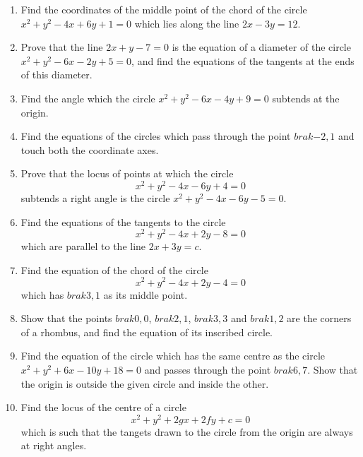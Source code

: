 \begin{enumerate}[1.]
\item Find the coordinates of the middle point of the chord of the circle
$x^2+y^2-4x+6y+1=0$ which lies along the line $2x-3y=12$.  
\item Prove that the line $2x+y-7=0$ is the equation of a diameter of the circle
$x^2+y^2-6x-2y+5=0$, and find the equations of the tangents at the ends of this
diameter.
\item Find the angle which the circle $x^2+y^2-6x-4y+9=0$ subtends at
the origin.
\item Find the equations of the circles which pass through the point $brak{-2,1}$
and touch both the coordinate axes.
\item Prove that the locus of points at which the circle
\begin{equation}
x^2+y^2-4x-6y+4=0
\end{equation}
subtends a right angle is the circle $x^2+y^2-4x-6y-5=0$.
\item Find the equations of the tangents to the circle
\begin{equation}
x^2+y^2-4x+2y-8=0
\end{equation}
which are parallel to the line $2x+3y=c$.
\item Find the equation of the chord of the circle
\begin{equation}
x^2+y^2-4x+2y-4=0
\end{equation}
which has $brak{3,1}$ as its middle point.
\item Show that the points $brak{0,0}$, $brak{2,1}$, $brak{3,3}$
and $brak{1,2}$ are the corners of a rhombus, and find the equation
of its inscribed circle.
\item Find the equation of the circle which has the same centre as the circle
$x^2+y^2+6x-10y+18=0$ and passes through the point $brak{6,7}$.  Show that
the origin is outside the given circle and inside the other.
\item Find the locus of the centre of a circle
\begin{equation}
x^2+y^2+2gx+2fy+c=0
\end{equation}
which is such that the tangets drawn to the circle from the origin are always at right angles.
\end{enumerate}
